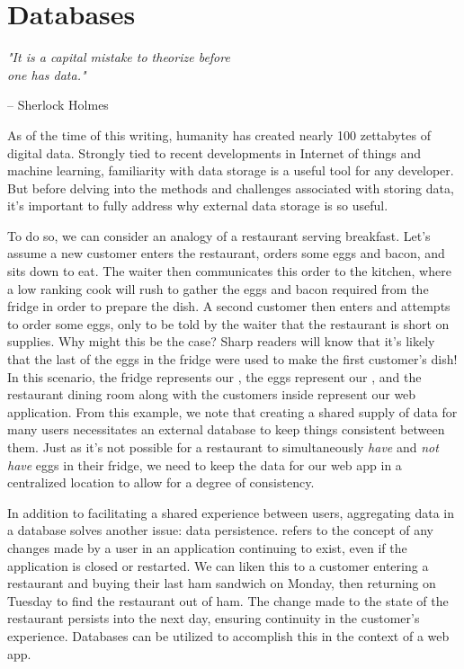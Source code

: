 \setchapterpreamble[u]{\margintoc}
\chapter{Databases}
\epigraph{\emph{"It is a capital mistake to theorize before  \\ one has data."}}{ -- Sherlock Holmes}

As of the time of this writing, humanity has created nearly 100 zettabytes of digital data. Strongly tied to recent developments in Internet of things and machine learning, familiarity with data storage is a useful tool for any developer. But before delving into the methods and challenges associated with storing data, it's important to fully address why external data storage is so useful.

To do so, we can consider an analogy of a restaurant serving breakfast. Let's assume a new customer enters the restaurant, orders some eggs and bacon, and sits down to eat. The waiter then communicates this order to the kitchen, where a low ranking cook will rush to gather the eggs and bacon required from the fridge in order to prepare the dish. A second customer then enters and attempts to order some eggs, only to be told by the waiter that the restaurant is short on supplies. Why might this be the case? Sharp readers will know that it's likely that the last of the eggs in the fridge were used to make the first customer's dish! In this scenario, the fridge represents our , the eggs represent our , and the restaurant dining room along with the customers inside represent our web application. From this example, we note that creating a shared supply of data for many users necessitates an external database to keep things consistent between them. Just as it's not possible for a restaurant to simultaneously \emph{have} and \emph{not have} eggs in their fridge, we need to keep the data for our web app in a centralized location to allow for a degree of consistency.

In addition to facilitating a shared experience between users, aggregating data in a database solves another issue: data persistence.  refers to the concept of any changes made by a user in an application continuing to exist, even if the application is closed or restarted. We can liken this to a customer entering a restaurant and buying their last ham sandwich on Monday, then returning on Tuesday to find the restaurant out of ham. The change made to the state of the restaurant persists into the next day, ensuring continuity in the customer's experience. Databases can be utilized to accomplish this in the context of a web app.

